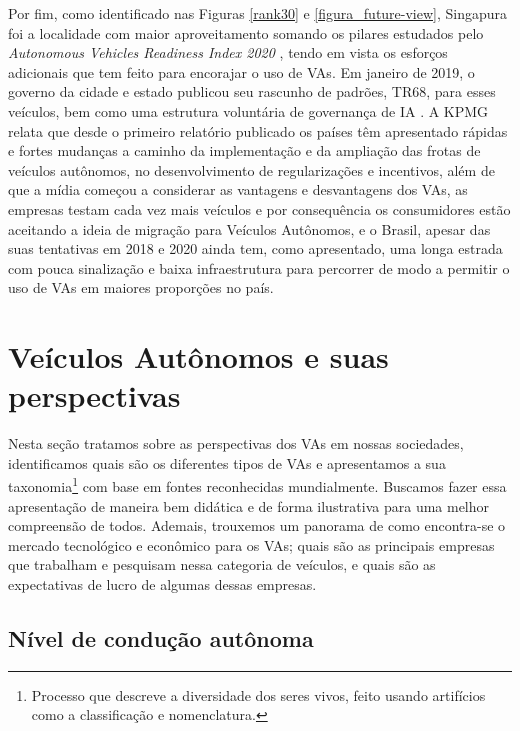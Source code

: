 Por fim, como identificado nas Figuras \ref{rank30} e \ref{figura_future-view}, Singapura foi a localidade com maior aproveitamento somando os pilares estudados pelo \textit{Autonomous Vehicles Readiness Index 2020} \cite{KPMG}, tendo em vista os esforços adicionais que tem feito para encorajar o uso de VAs. Em janeiro de 2019, o governo da cidade e estado publicou seu rascunho de padrões, TR68, para esses veículos, bem como uma estrutura voluntária de governança de IA \cite{KPMG}. A KPMG relata que desde o primeiro relatório publicado os países têm apresentado rápidas e fortes mudanças a caminho da implementação e da ampliação das frotas de veículos autônomos, no desenvolvimento de regularizações e incentivos, além de que a mídia começou a considerar as vantagens e desvantagens dos VAs, as empresas testam cada vez mais veículos e por consequência os consumidores estão aceitando a ideia de migração para Veículos Autônomos, e o Brasil, apesar das suas tentativas em 2018 e 2020 ainda tem, como apresentado, uma longa estrada com pouca sinalização e baixa infraestrutura para percorrer de modo a permitir o uso de VAs em maiores proporções no país.

\newpage
\section{Veículos Autônomos e suas perspectivas}

Nesta seção tratamos sobre as perspectivas dos VAs em nossas sociedades, identificamos quais são os diferentes tipos de VAs e apresentamos a sua taxonomia\footnote{Processo que descreve a diversidade dos seres vivos, feito usando artifícios como a classificação e nomenclatura.} com base em fontes reconhecidas mundialmente. Buscamos fazer essa apresentação de maneira bem didática e de forma ilustrativa para uma melhor compreensão de todos. Ademais, trouxemos um panorama de como encontra-se o mercado tecnológico e econômico para os VAs; quais são as principais empresas que trabalham e pesquisam nessa categoria de veículos, e quais são as expectativas de lucro de algumas dessas empresas.

\subsection{Nível de condução autônoma}  \label{nv3}
	
